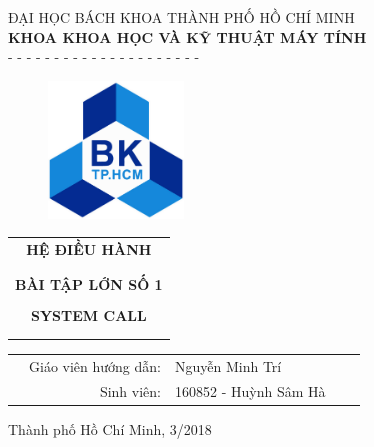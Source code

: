 \begin{titlepage}
\vspace{1.5cm}
\begin{center} \large
ĐẠI HỌC BÁCH KHOA THÀNH PHỐ HỒ CHÍ MINH \\
\textbf{KHOA KHOA HỌC VÀ KỸ THUẬT MÁY TÍNH} \\
- - - - - - - - - - - - - - - - - - - - - 
\end{center}


\vspace{1cm}
\begin{figure}[h!]
\begin{center}
\includegraphics[width=3.6cm]{Images/LogoBK}
\end{center}
\end{figure}
\vspace{1cm}



\begin{center}
\begin{tabular}{c}
\multicolumn{1}{c}{\textbf{{\Huge HỆ ĐIỀU HÀNH}}}\\
\\ \hline \\
\textbf{{\Large BÀI TẬP LỚN SỐ 1}}\\
\\
\textbf{{\huge SYSTEM CALL}}\\
\\ \hline \\
\end{tabular}
\end{center}



\begin{table}[h]
\begin{tabular}{rrlrr}
\hspace{5cm} 
& {\large Giáo viên hướng dẫn}: & {\large Nguyễn Minh Trí} & & \\ 
& {\large Sinh viên}: & {\large 160852 - Huỳnh Sâm Hà} \\
\end{tabular}
\end{table}

\vspace{3cm}

\begin{center}
{\footnotesize Thành phố Hồ Chí Minh, 3/2018}
\end{center}

\end{titlepage}
